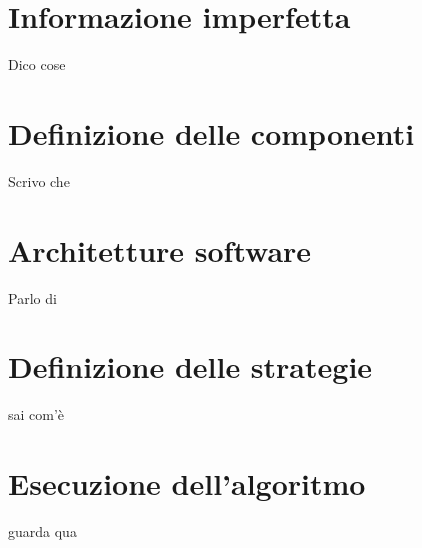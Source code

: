 \section{Informazione imperfetta}
	Dico cose
	
\section{Definizione delle componenti}
	Scrivo che
	
\section{Architetture software}
	Parlo di
	
\section{Definizione delle strategie}
	sai com'è
	
\section{Esecuzione dell'algoritmo}
	guarda qua